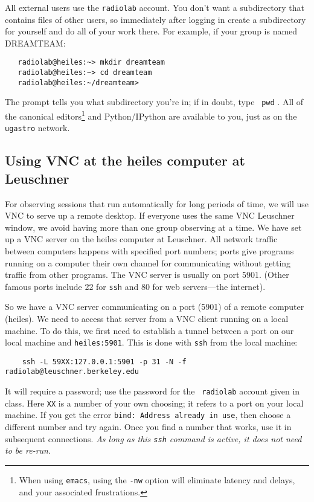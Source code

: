 \documentclass[psfig,preprint]{aastex}
\begin{document}
All external users use the {\tt radiolab} account. You don't
want a subdirectory that contains files of other users, so immediately
after logging in create a subdirectory for yourself and do all of your
work there. For example, if your group is named DREAMTEAM: 
\begin{verbatim}
   radiolab@heiles:~> mkdir dreamteam
   radiolab@heiles:~> cd dreamteam
   radiolab@heiles:~/dreamteam> 
\end{verbatim}
The prompt tells you what subdirectory you're in; if in doubt, type {\tt
  pwd} . All of the canonical editors\footnote{When using {\tt emacs}, using the
  {\tt -nw} option will eliminate latency and delays, and your
  associated frustrations.} and Python/IPython are available to you, just as on the
{\tt ugastro} network.

\subsection {Using VNC at the heiles computer at Leuschner}
For observing sessions that run automatically for long periods of
time, we will use VNC to serve up a remote desktop.
If everyone uses the same VNC Leuschner window, we
avoid having more than one group observing at a time. We have set
up a VNC server on the heiles computer at Leuschner.  All network traffic
between computers happens with specified port numbers; ports give 
programs running on a computer their own channel for communicating without
getting traffic from other programs.  The VNC
server is usually on port 5901.  (Other famous ports include 22 for {\tt ssh} and 80 for web servers---the internet).

So we have a VNC server communicating on a port (5901) of a remote computer (heiles).
We need to access that server from a VNC client running on a local machine.
To do this, we first need to establish a tunnel between a port on our local machine
and {\tt heiles:5901}.  This is done with {\tt ssh} from the local machine:
\begin{verbatim}
    ssh -L 59XX:127.0.0.1:5901 -p 31 -N -f radiolab@leuschner.berkeley.edu
\end{verbatim}
\noindent It will require a password; use the password for the {\tt
  radiolab} account given in class. Here {\tt XX} is a number of your
own choosing; it refers to a port on your local machine. If you get the error
{\tt bind: Address already in use}, then choose a different
number and try again. Once you find a number that works, use it in
subsequent connections. {\it As long as this {\tt ssh} command is active, it does not need to be re-run}.
\end{document}

